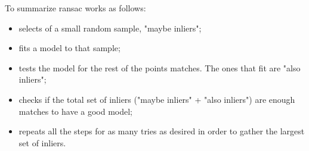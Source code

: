 To summarize \acrshort{ransac} works as follows:

\begin{itemize}
	\item selects of a small random sample, "maybe inliers";
	\item fits a model to that sample;
	\item tests the model for the rest of the points matches. The ones that fit are "also inliers";
	\item checks if the total set of inliers ("maybe inliers" + "also inliers") are enough matches to have a good model;
	\item repeats all the steps for as many tries as desired in order to gather the largest set of inliers.
\end{itemize}

